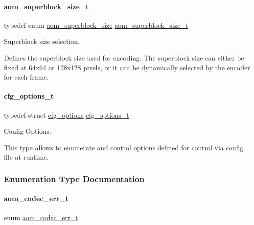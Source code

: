 \paragraph{\texorpdfstring{aom\+\_\+superblock\+\_\+size\+\_\+t}{aom\_superblock\_size\_t}}
{\footnotesize\ttfamily typedef enum \hyperlink{group__codec_gac34a24f7c6c0fef7518aed0da4425f61}{aom\+\_\+superblock\+\_\+size}  \hyperlink{group__codec_ga8d0bf39eb86f047f1b2f6f1efe05a3ae}{aom\+\_\+superblock\+\_\+size\+\_\+t}}



Superblock size selection. 

Defines the superblock size used for encoding. The superblock size can either be fixed at 64x64 or 128x128 pixels, or it can be dynamically selected by the encoder for each frame. \mbox{\label{group__codec_ga58cddec4492c70945a2b4c3773c665b0}} 
\paragraph{\texorpdfstring{cfg\+\_\+options\+\_\+t}{cfg\_options\_t}}
{\footnotesize\ttfamily typedef struct \hyperlink{structcfg__options}{cfg\+\_\+options}  \hyperlink{group__codec_ga58cddec4492c70945a2b4c3773c665b0}{cfg\+\_\+options\+\_\+t}}



Config Options. 

This type allows to enumerate and control options defined for control via config file at runtime. 

\subsubsection{Enumeration Type Documentation}
\mbox{\label{group__codec_gaaae61e0f8663e6137f1e228757248e7c}} 
\paragraph{\texorpdfstring{aom\+\_\+codec\+\_\+err\+\_\+t}{aom\_codec\_err\_t}}
{\footnotesize\ttfamily enum \hyperlink{group__codec_gaaae61e0f8663e6137f1e228757248e7c}{aom\+\_\+codec\+\_\+err\+\_\+t}}



